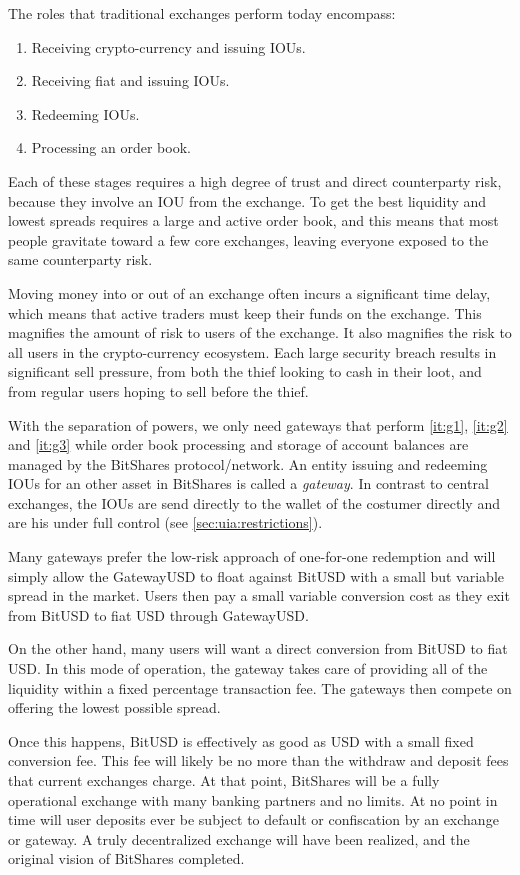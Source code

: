 \label{sec:gateway}

The roles that traditional exchanges perform today encompass:

\begin{enumerate}
 \item \label{it:g1} Receiving crypto-currency and issuing IOUs.
 \item \label{it:g2} Receiving fiat and issuing IOUs.
 \item \label{it:g3} Redeeming IOUs.
 \item \label{it:g4} Processing an order book.
\end{enumerate}

Each of these stages requires a high degree of trust and direct counterparty
risk, because they involve an IOU from the exchange. To get the best
liquidity and lowest spreads requires a large and active order book, and this
means that most people gravitate toward a few core exchanges, leaving everyone
exposed to the same counterparty risk.

Moving money into or out of an exchange often incurs a significant time delay,
which means that active traders must keep their funds on the exchange. This
magnifies the amount of risk to users of the exchange. It also magnifies the
risk to all users in the crypto-currency ecosystem. Each large security breach
results in significant sell pressure, from both the thief looking to cash in
their loot, and from regular users hoping to sell before the thief.

\medskip

With the separation of powers, we only need gateways that perform
\cref{it:g1}, \cref{it:g2} and \cref{it:g3} while order book processing and
storage of account balances are managed by the BitShares protocol/network. An
entity issuing and redeeming IOUs for an other asset in BitShares is called a
\emph{gateway}. In contrast to central exchanges, the IOUs are send directly
to the wallet of the costumer directly and are his under full control (see
\cref{sec:uia:restrictions}).

Many gateways prefer the low-risk approach of one-for-one redemption and will
simply allow the GatewayUSD to float against BitUSD with a small but variable
spread in the market. Users then pay a small variable conversion cost as they
exit from BitUSD to fiat USD through GatewayUSD.

On the other hand, many users will want a direct conversion from BitUSD to fiat
USD. In this mode of operation, the gateway takes care of providing all of the
liquidity within a fixed percentage transaction fee. The gateways then
compete on offering the lowest possible spread.

Once this happens, BitUSD is effectively as good as USD with a small fixed
conversion fee. This fee will likely be no more than the withdraw and deposit
fees that current exchanges charge. At that point, BitShares will be a fully
operational exchange with many banking partners and no limits. At no point in
time will user deposits ever be subject to default or confiscation by an
exchange or gateway. A truly decentralized exchange will have been realized,
and the original vision of BitShares completed.
